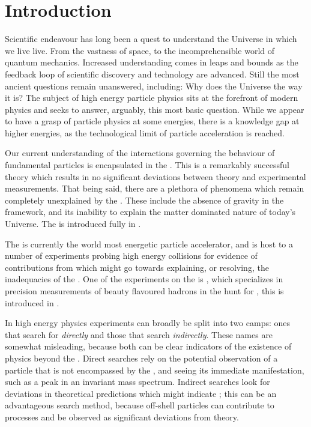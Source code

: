 \chapter{Introduction}
\label{ch:intro}


Scientific endeavour has long been a quest to understand the Universe in which we live live.
From the vastness of space, to the incomprehensible world of quantum mechanics.
Increased understanding comes in leaps and bounds as the feedback loop of scientific discovery and
technology are advanced.
Still the most ancient questions remain unanswered, including: Why does the Universe the way it is?
The subject of high energy particle physics sits at the forefront of modern physics and seeks to
answer, arguably, this most basic question.
While we appear to have a grasp of particle physics at some energies, there is a knowledge gap at
higher energies, as the technological limit of particle acceleration is reached.

Our current understanding of the interactions governing the behaviour of fundamental particles is
encapsulated in the \sm.
This is a remarkably successful theory which results in no significant deviations between theory
and experimental measurements.
That being said, there are a plethora of phenomena which remain completely unexplained by the \sm.
These include the absence of gravity in the \sm framework, and its inability to explain the matter
dominated nature of today's Universe.
The \sm is introduced fully in .

The \lhc is currently the world most energetic particle accelerator, and is host to a number of
experiments probing high energy collisions for evidence of contributions from \np which might go
towards explaining, or resolving, the inadequacies of the \sm.
One of the experiments on the \lhc is \lhcb, which specializes in precision measurements of beauty
flavoured hadrons in the hunt for \np, this is introduced in .

In high energy physics experiments can broadly be split into two camps: ones that search for \np
\emph{directly} and those that search \emph{indirectly}.
These names are somewhat misleading, because both can be clear indicators of the existence of
physics beyond the \sm.
Direct searches rely on the potential observation of a particle that is not encompassed by the \sm,
and seeing its immediate manifestation, such as a peak in an invariant mass spectrum.
Indirect searches look for deviations in theoretical predictions which might indicate \np; this can
be an advantageous search method, because off-shell particles can contribute to processes and be
observed as significant deviations from theory.

